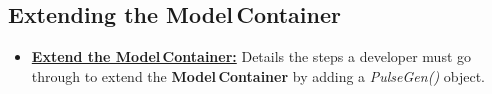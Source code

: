 \documentclass[12pt]{article}
\begin{document}
\subsection*{Extending the Model\,Container}
\begin{itemize}
   \item \href{../genesis-extend-model-container/genesis-extend-model-container.tex}{\bf Extend the Model\,Container:} Details the steps a developer must go through to extend the {\bf Model\,Container} by adding a {\it PulseGen()} object.
\end{itemize}


    
\end{document}
